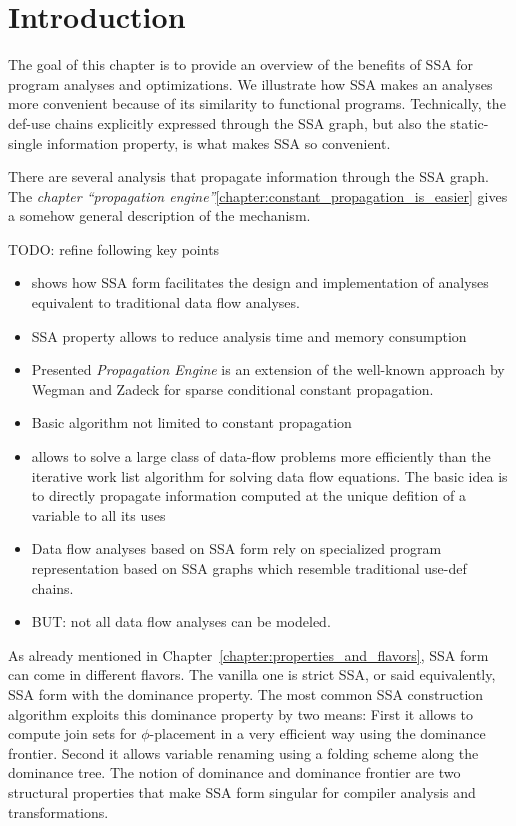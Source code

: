 \chapter{Introduction
  }
\label{chapter:analysis}

The goal of this chapter is to provide an overview of the benefits of
SSA for program analyses and optimizations. We illustrate how SSA
makes an analyses more convenient because of its similarity to
functional programs. Technically, the def-use chains explicitly
expressed through the SSA graph, but also the static-single
information property, is what makes SSA so convenient.

\ifconstantprop

There are several analysis that propagate information through the SSA
graph.  The \emph{chapter ``propagation
  engine''}\ref{chapter:constant_propagation_is_easier} gives a
somehow general description of the mechanism.

TODO: refine following key points

\begin{itemize}
\item shows how SSA form facilitates the design and implementation of analyses equivalent to traditional data flow analyses.
\item SSA property allows to reduce analysis time and memory consumption
\item Presented {\em Propagation Engine} is an extension of the well-known approach by Wegman and Zadeck for sparse conditional constant propagation.
\item Basic algorithm not limited to constant propagation
\item allows to solve a large class of data-flow problems more efficiently than the iterative work list algorithm for solving data flow equations. The basic idea is to directly propagate information computed at the unique defition of a variable to all its uses
\item Data flow analyses based on SSA form rely on specialized program representation based on SSA graphs which resemble traditional use-def chains.
\item BUT: not all data flow analyses can be modeled.
\end{itemize}

\fi

As already mentioned in Chapter~\ref{chapter:properties_and_flavors},
SSA form can come in different flavors. The vanilla one is strict SSA, or said
equivalently, SSA form with the dominance property. The most common SSA
construction algorithm exploits this dominance property by two means:
First it allows to compute join sets for $\phi$-placement in a very
efficient way using the dominance frontier.  Second it allows variable
renaming using a folding scheme along the dominance tree.  The notion
of dominance and dominance frontier are two structural properties that
make SSA form singular for compiler analysis and transformations.

